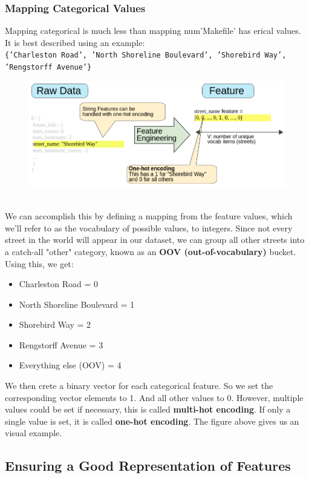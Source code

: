 \documentclass[12pt]{article}
\begin{document}
\subsubsection{Mapping Categorical Values} 
Mapping categorical is much less than mapping num'Makefile' has erical values. It is best described using an example:
\\
{\tt{\{'Charleston Road', 'North Shoreline Boulevard', 'Shorebird Way', 'Rengstorff Avenue'}\}}
\begin{figure}[h]
	\includegraphics[scale = 0.5]{imgs/RawToStringFeature.png}
	\centering
	\caption{}
\end{figure}
\\We can accomplish this by defining a mapping from the feature values, which we'll refer to as the vocabulary of possible values, to integers. Since not every street in the world will appear in our dataset, we can group all other streets into a catch-all "other" category, known as an \textbf{OOV (out-of-vocabulary)} bucket.
\\Using this, we get:
\begin{itemize}
	\item Charleston Road = 0
	\item North Shoreline Boulevard = 1
	\item Shorebird Way = 2
	\item Rengstorff Avenue = 3
	\item Everything else (OOV) = 4
\end{itemize}
We then crete a binary vector for each categorical feature. So we set the corresponding vector elements to 1. And all other values to 0. However, multiple values could be set if necessary, this is called \textbf{multi-hot encoding}. If only a single value is set, it is called \textbf{one-hot encoding}. The figure above gives us an visual example.

\subsection{Ensuring a Good Representation of Features}
\end{document}
